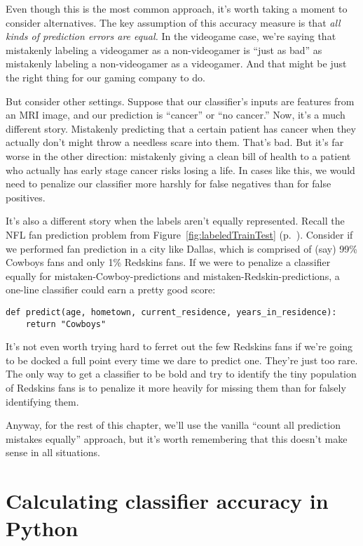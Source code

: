 Even though this is the most common approach, it's worth taking a moment to
consider alternatives. The key assumption of this accuracy measure is that
\textit{all kinds of prediction errors are equal.} In the videogame case, we're
saying that mistakenly labeling a videogamer as a non-videogamer is ``just as
bad'' as mistakenly labeling a non-videogamer as a videogamer. And that might
be just the right thing for our gaming company to do.

But consider other settings. Suppose that our classifier's inputs are features
from an MRI image, and our prediction is ``cancer'' or ``no cancer.'' Now, it's
a much different story. Mistakenly predicting that a certain patient has cancer
when they actually don't might throw a needless scare into them. That's bad.
But it's far worse in the other direction: mistakenly giving a clean bill of
health to a patient who actually has early stage cancer risks losing a life. In
cases like this, we would need to penalize our classifier more harshly for
false negatives than for false positives.

It's also a different story when the labels aren't equally represented. Recall
the NFL fan prediction problem from Figure~\ref{fig:labeledTrainTest}
(p.~\pageref{fig:labeledTrainTest}). Consider if we performed fan prediction in
a city like Dallas, which is comprised of (say) 99\% Cowboys fans and only 1\%
Redskins fans. If we were to penalize a classifier equally for
mistaken-Cowboy-predictions and mistaken-Redskin-predictions, a one-line
classifier could earn a pretty good score:

\begin{Verbatim}[fontsize=\small,samepage=true,frame=single,framesep=3mm]
def predict(age, hometown, current_residence, years_in_residence):
    return "Cowboys"
\end{Verbatim}
 
It's not even worth trying hard to ferret out the few Redskins fans if we're
going to be docked a full point every time we dare to predict one. They're just
too rare. The only way to get a classifier to be bold and try to identify the
tiny population of Redskins fans is to penalize it more heavily for missing
them than for falsely identifying them.

Anyway, for the rest of this chapter, we'll use the vanilla ``count all
prediction mistakes equally'' approach, but it's worth remembering that this
doesn't make sense in all situations.

\section{Calculating classifier accuracy in Python}

